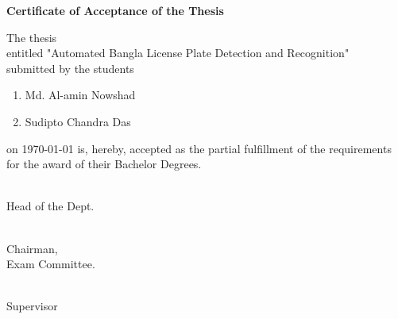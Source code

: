 \begin{center}
	\textbf{\huge Certificate of Acceptance of the Thesis} \\
\end{center}

\vspace{0.5cm}

\noindent
The thesis\\
entitled "{Automated Bangla License Plate Detection and Recognition}"\\
submitted by the students
\begin{enumerate}
	\item Md. Al-amin Nowshad
	\item Sudipto Chandra Das
\end{enumerate}	
on \today
\noindent
is, hereby, accepted as the partial fulfillment of the requirements for the award of their Bachelor Degrees.
			
\vspace{4.0cm}


\begin{multicols}{3}	
	\begin{flushleft}
		\hrulefill \\
        \centering
		Head of the Dept.
	\end{flushleft}
	
    \begin{flushleft}
		\hrulefill \\
        \centering
		Chairman,\\ 
        Exam Committee.
	\end{flushleft}				
	
    \begin{flushleft}
		\hrulefill \\
        \centering
		Supervisor
	\end{flushleft}    
\end{multicols}

